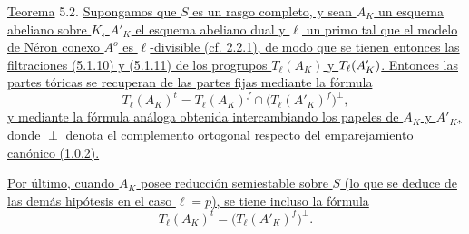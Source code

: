 \par\medskip
\noindent
\underline{Teorema} 5.2. \underline{Supongamos que $S$ es un rasgo
completo, y sean $A_K$ un esquema abeliano sobre $K$, $A'_K$ el esquema
abeliano dual y $\ell$ un primo tal que el modelo de Néron conexo $A^o$
es $\ell$-divisible (cf. 2.2.1), de modo que se tienen entonces las
filtraciones (5.1.10) y (5.1.11) de los progrupos $T_\ell(A_K)$ y
$T_\ell(\sisi{A_{K'}}{A'_K})$. Entonces las partes tóricas se recuperan de las partes
fijas mediante la fórmula}
\begin{equation}\tag{5.2.1}
 T_\ell(A_K)^t
 =
 T_\ell(A_K)^f\cap\bigl(T_\ell(A'_K)^f\bigr)^\perp,
\end{equation}
\underline{y mediante la fórmula análoga obtenida intercambiando los
papeles de $A_K$ y $A'_K$, donde $\perp$ denota el complemento ortogonal
respecto del emparejamiento canónico (1.0.2).}

\underline{Por último, cuando $A_K$ posee reducción semiestable sobre
$S$ (lo que se deduce de las demás hipótesis en el caso $\ell=p$), se
tiene incluso la fórmula}
\begin{equation}\tag{5.2.2}
 T_\ell(A_K)^t=\bigl(T_\ell(A'_K)^f\bigr)^\perp.
\end{equation}

